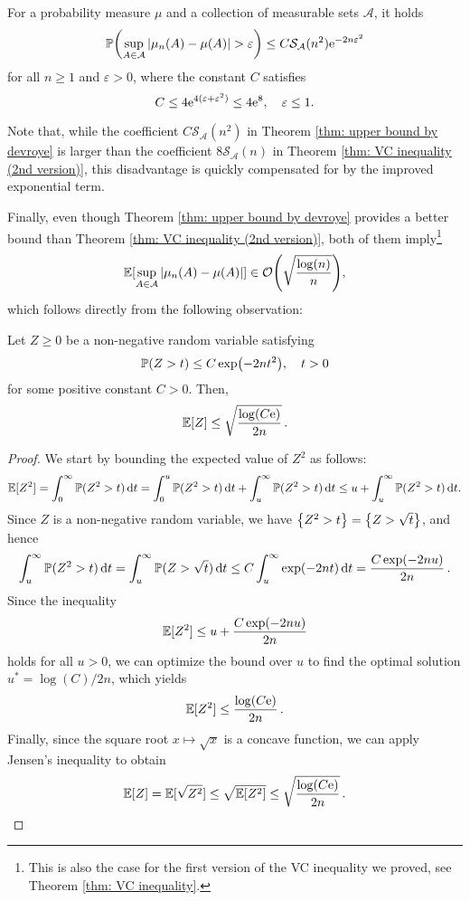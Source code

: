 \begin{theorem}[Devroye, 1982]
\label{thm: upper bound by devroye}
For a probability measure $\mu$ and a collection of measurable sets $\mathcal{A}$, it holds
\[
    \P\left(\sup_{A \in \mathcal{A}} \abs{\mu_n(A) - \mu(A)} > \varepsilon\right) \leq C \mathcal{S}_{\mathcal{A}}(n^2) \e^{-2n \varepsilon^2}
\]
for all $n \geq 1$ and $\varepsilon > 0$, where the constant $C$ satisfies
\[
    C \leq 4 \e^{4(\varepsilon + \varepsilon^2)} \leq 4 \e^8, \quad \varepsilon \leq 1.
\]
\end{theorem}

Note that, while the coefficient $C \mathcal{S}_{\mathcal{A}}(n^2)$ in Theorem \ref{thm: upper bound by devroye} is larger than the coefficient $8 \mathcal{S}_{\mathcal{A}}(n)$ in Theorem \ref{thm: VC inequality (2nd version)}, this disadvantage is quickly compensated for by the improved exponential term.

Finally, even though Theorem \ref{thm: upper bound by devroye} provides a better bound than Theorem \ref{thm: VC inequality (2nd version)}, both of them imply\footnote{This is also the case for the first version of the VC inequality we proved, see Theorem \ref{thm: VC inequality}.}
\begin{equation}
\label{eq: order of uniform deviations}
    \Exp[\sup_{A \in \mathcal{A}} \abs{\mu_n(A) - \mu(A)}] \in \mathcal{O}\left(\sqrt{\frac{\log(n)}{n}}\right),
\end{equation}
which follows directly from the following observation:

\begin{proposition}
Let $Z \geq 0$ be a non-negative random variable satisfying
\[
    \P(Z > t) \leq C \exp(-2nt^2), \quad t > 0
\]
for some positive constant $C > 0$. Then,
\[
    \Exp[Z] \leq \sqrt{\frac{\log(C\e)}{2n}} \, .
\]
\end{proposition}

\begin{proof}
We start by bounding the expected value of $Z^2$ as follows:
\[
    \Exp[Z^2] = \int_0^{\infty} \P(Z^2 > t) \dt = \int_0^u \P(Z^2 > t) \dt + \int_u^{\infty} \P(Z^2 > t) \dt \leq u + \int_u^{\infty} \P(Z^2 > t) \dt.
\]
Since $Z$ is a non-negative random variable, we have $\set{Z^2 > t} = \set{Z > \sqrt{t}}$, and hence
\[
    \int_u^{\infty} \P(Z^2 > t) \dt = \int_u^{\infty} \P(Z > \sqrt{t}) \dt \leq C \int_u^{\infty} \exp(-2nt) \dt = \frac{C \exp(-2nu)}{2n} \, .
\]
Since the inequality
\[
    \Exp[Z^2] \leq u + \frac{C \exp(-2nu)}{2n}
\]
holds for all $u > 0$, we can optimize the bound over $u$ to find the optimal solution $u^* = \log(C) / 2n$, which yields
\[
    \Exp[Z^2] \leq \frac{\log(C\e)}{2n} \, .
\]
Finally, since the square root $x \mapsto \sqrt{x}$ is a concave function, we can apply Jensen's inequality to obtain
\[
    \Exp[Z] = \Exp[\sqrt{Z^2}] \leq \sqrt{\Exp[Z^2]} \leq \sqrt{\frac{\log(C\e)}{2n}} \, . \qedhere
\]
\end{proof}

